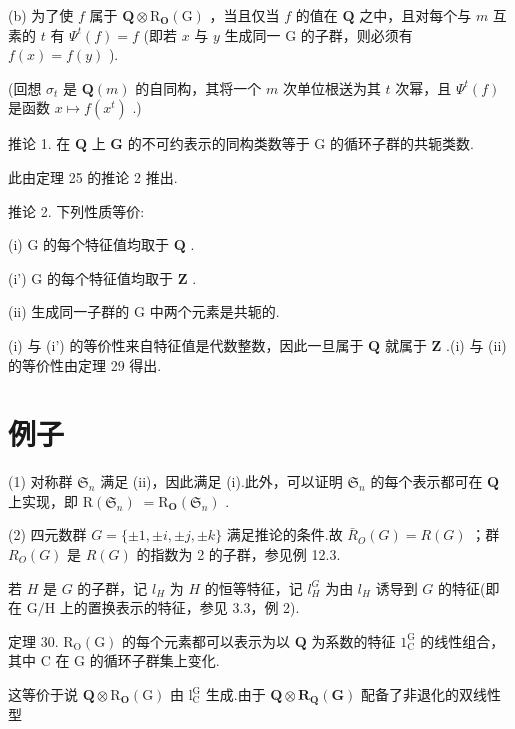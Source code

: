 \documentclass[10pt]{article}
\begin{document}
(b) 为了使 \(f\) 属于 \(\mathbf{Q} \otimes  {\mathrm{R}}_{\mathbf{O}}\left( \mathrm{G}\right)\) ，当且仅当 \(f\) 的值在 \(\mathbf{Q}\) 之中，且对每个与 \(m\) 互素的 \(t\) 有 \({\Psi }^{t}\left( f\right)  = f\) (即若 \(x\) 与 \(y\) 生成同一 \(\mathrm{G}\) 的子群，则必须有 \(f\left( x\right)  = f\left( y\right)\) ).

(回想 \({\sigma }_{t}\) 是 \(\mathbf{Q}\left( m\right)\) 的自同构，其将一个 \(m\) 次单位根送为其 \(t\) 次幂，且 \({\Psi }^{t}\left( f\right)\) 是函数 \(x \mapsto  f\left( {x}^{t}\right)\) .)

推论 1. 在 \(\mathbf{Q}\) 上 \(\mathbf{G}\) 的不可约表示的同构类数等于 \(\mathrm{G}\) 的循环子群的共轭类数.

此由定理 25 的推论 2 推出.

推论 2. 下列性质等价:

(i) \(\mathrm{G}\) 的每个特征值均取于 \(\mathbf{Q}\) .

(i') \(\mathrm{G}\) 的每个特征值均取于 \(\mathbf{Z}\) .

(ii) 生成同一子群的 \(\mathrm{G}\) 中两个元素是共轭的.

(i) 与 (i') 的等价性来自特征值是代数整数，因此一旦属于 \(\mathbf{Q}\) 就属于 \(\mathbf{Z}\) .(i) 与 (ii) 的等价性由定理 29 得出.

\section*{例子}

(1) 对称群 \({\mathfrak{S}}_{n}\) 满足 (ii)，因此满足 (i).此外，可以证明 \({\mathfrak{S}}_{n}\) 的每个表示都可在 \(\mathbf{Q}\) 上实现，即 \(\mathrm{R}\left( {\mathfrak{S}}_{n}\right) \; = {\mathrm{R}}_{\mathbf{O}}\left( {\mathfrak{S}}_{n}\right)\) .

(2) 四元数群 \(G = \{  \pm  1, \pm  i, \pm  j, \pm  k\}\) 满足推论的条件.故 \({\bar{R}}_{O}\left( G\right)  = R\left( G\right)\) ；群 \({R}_{O}\left( G\right)\) 是 \(R\left( G\right)\) 的指数为 2 的子群，参见例 12.3.

若 \(H\) 是 \(G\) 的子群，记 \({l}_{H}\) 为 \(H\) 的恒等特征，记 \({l}_{H}^{G}\) 为由 \({l}_{H}\) 诱导到 \(G\) 的特征(即在 \(\mathrm{G}/\mathrm{H}\) 上的置换表示的特征，参见 3.3，例 2).

定理 30. \({\mathrm{R}}_{\mathrm{O}}\left( \mathrm{G}\right)\) 的每个元素都可以表示为以 \(\mathbf{Q}\) 为系数的特征 \({1}_{\mathrm{C}}^{\mathrm{G}}\) 的线性组合，其中 \(\mathrm{C}\) 在 \(\mathrm{G}\) 的循环子群集上变化.

这等价于说 \(\mathbf{Q} \otimes  {\mathrm{R}}_{\mathbf{O}}\left( \mathrm{G}\right)\) 由 \({\mathrm{l}}_{\mathrm{C}}^{\mathrm{G}}\) 生成.由于 \(\mathbf{Q} \otimes  {\mathbf{R}}_{\mathbf{Q}}\left( \mathbf{G}\right)\) 配备了非退化的双线性型
\end{document}
